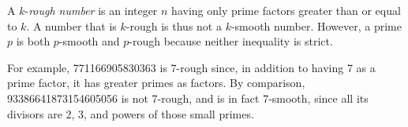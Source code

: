 \documentclass[12pt]{article}
\begin{document}

A $k$-{\em rough number} is an integer $n$ having only prime factors greater than or equal to $k$. A number that is $k$-rough is thus not a $k$-smooth number. However, a prime $p$ is both $p$-smooth and $p$-rough because neither inequality is strict.

For example, 771166905830363 is 7-rough since, in addition to having 7 as a prime factor, it has greater primes as factors. By comparison, 93386641873154605056 is not 7-rough, and is in fact 7-smooth, since all its divisors are 2, 3,  and powers of those small primes.
\end{document}
